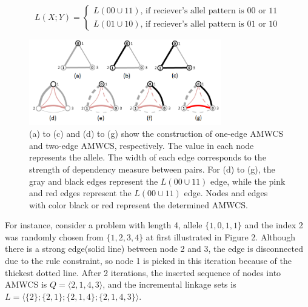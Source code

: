 \documentclass{sig-alternate-05-2015}
\begin{document}
\begin{displaymath}
L(X;Y) = 
   \begin{cases}
    L(00\cup11) \text{, if reciever's allel pattern is 00 or 11} \\
    L(01\cup10) \text{, if reciever's allel pattern is 01 or 10} 
	\end{cases}
\end{displaymath}



\begin{figure}
\centering
\includegraphics[width=3.3in]{AMWCS}
\caption{(a) to (c) and (d) to (g) show the construction of  one-edge AMWCS and two-edge AMWCS, respectively. The value in each node represents the allele. The width of each edge corresponds to the strength of dependency measure between pairs. For (d) to (g), the gray and black edges represent the $L(00\cup11)$ edge, while the pink and red edges represent the $L(00\cup11)$ edge. Nodes and edges with color black or red represent the determined AMWCS.}
\end{figure}


For instance, consider a problem with length 4, allele $\{1, 0, 1, 1\}$ and the index 2 was randomly chosen from $ \{1, 2, 3, 4\}$ at first illustrated in Figure 2. Although there is a strong edge(solid line) between node 2 and 3, the edge is disconnected due to the rule constraint, so node 1 is picked in this iteration because of the thickest dotted line. After 2 iterations, the inserted sequence of nodes into AMWCS is $Q = ⟨2, 1, 4, 3⟩$, and the incremental linkage sets is $L = \langle\{2\}; \{2, 1\};\{2, 1, 4\}; \{ 2, 1,  4,  3\}\rangle$.
\end{document}
